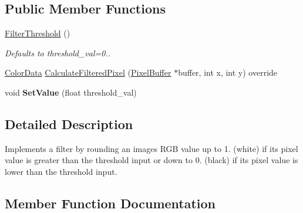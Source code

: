 \subsection*{Public Member Functions}
\begin{DoxyCompactItemize}
\item 
\mbox{\label{classimage__tools_1_1FilterThreshold_a10675d611d33cdead5ddecfaa3b8494c}} 
\hyperlink{classimage__tools_1_1FilterThreshold_a10675d611d33cdead5ddecfaa3b8494c}{Filter\+Threshold} ()
\begin{DoxyCompactList}\small\item\em Defaults to threshold\+\_\+val=0.. \end{DoxyCompactList}\item 
\hyperlink{classimage__tools_1_1ColorData}{Color\+Data} \hyperlink{classimage__tools_1_1FilterThreshold_a905065fd47d7228b11354795e487b2c6}{Calculate\+Filtered\+Pixel} (\hyperlink{classimage__tools_1_1PixelBuffer}{Pixel\+Buffer} $\ast$buffer, int x, int y) override
\item 
\mbox{\label{classimage__tools_1_1FilterThreshold_a1c939ef99b6370970ce6ca0227d66ad6}} 
void {\bfseries Set\+Value} (float threshold\+\_\+val)
\end{DoxyCompactItemize}


\subsection{Detailed Description}
Implements a filter by rounding an image\textquotesingle{}s R\+GB value up to 1. (white) if it\textquotesingle{}s pixel value is greater than the threshold input or down to 0. (black) if it\textquotesingle{}s pixel value is lower than the threshold input. 

\subsection{Member Function Documentation}
\mbox{\label{classimage__tools_1_1FilterThreshold_a905065fd47d7228b11354795e487b2c6}} 
